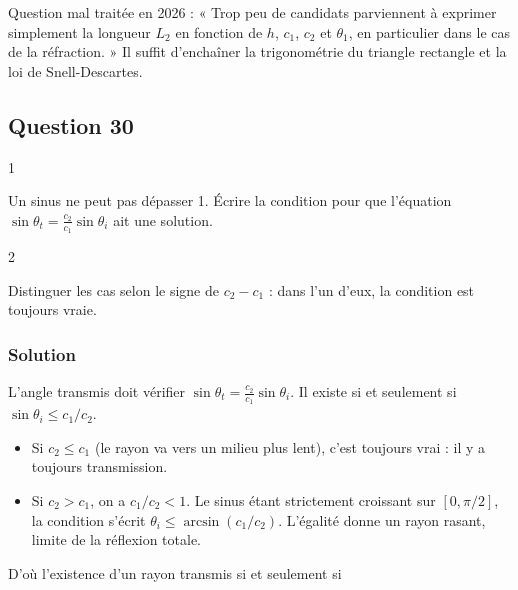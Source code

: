 \documentclass[11pt,a4paper]{article}
\providecommand{\tightlist}{\setlength{\itemsep}{0pt}\setlength{\parskip}{0pt}}
\begin{document}
\begin{jury}

Question mal traitée en 2026 : « Trop peu de candidats parviennent à exprimer simplement la longueur \(L_2\) en fonction de \(h\), \(c_1\), \(c_2\) et \(\theta_1\), en particulier dans le cas de la réfraction. » Il suffit d'enchaîner la trigonométrie du triangle rectangle et la loi de Snell-Descartes.

\end{jury}

\hypertarget{question-30}{%
\subsection{Question 30}\label{question-30}}

\begin{indication}{1}

Un sinus ne peut pas dépasser 1. Écrire la condition pour que l'équation \(\sin\theta_t = \frac{c_2}{c_1}\sin\theta_i\) ait une solution.

\end{indication}

\begin{indication}{2}

Distinguer les cas selon le signe de \(c_2 - c_1\) : dans l'un d'eux, la condition est toujours vraie.

\end{indication}

\hypertarget{solution-29}{%
\subsubsection{Solution}\label{solution-29}}

L'angle transmis doit vérifier \(\sin\theta_t = \frac{c_2}{c_1}\sin\theta_i\). Il existe si et seulement si \(\sin\theta_i \le c_1/c_2\).

\begin{itemize}
\tightlist
\item
  Si \(c_2 \le c_1\) (le rayon va vers un milieu plus lent), c'est toujours vrai : il y a toujours transmission.
\item
  Si \(c_2 > c_1\), on a \(c_1/c_2 < 1\). Le sinus étant strictement croissant sur \([0, \pi/2]\), la condition s'écrit \(\theta_i \le \arcsin(c_1/c_2)\). L'égalité donne un rayon rasant, limite de la réflexion totale.
\end{itemize}

D'où l'existence d'un rayon transmis si et seulement si
\end{document}
